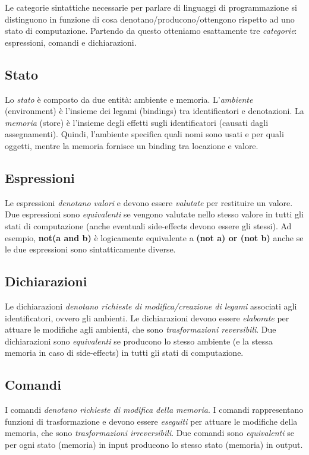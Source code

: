 \documentclass[a4paper,oneside,titlepage]{book}
\begin{document}
Le categorie sintattiche necessarie per parlare di linguaggi di programmazione si distinguono in funzione di cosa denotano/producono/ottengono rispetto ad uno stato di computazione. Partendo da questo otteniamo esattamente tre \textit{categorie}: espressioni, comandi e dichiarazioni.

\subsection{Stato}
Lo \textit{stato} è composto da due entità: ambiente e memoria. L'\textit{ambiente} (environment) è l'insieme dei legami (bindings) tra identificatori e denotazioni. La \textit{memoria} (store) è l'insieme degli effetti sugli identificatori (causati dagli assegnamenti). Quindi, l'ambiente specifica quali nomi sono usati e per quali oggetti, mentre la memoria fornisce un binding tra locazione e valore.

\subsection{Espressioni}
Le espressioni \textit{denotano valori} e devono essere \textit{valutate} per restituire un valore. Due espressioni sono \textit{equivalenti} se vengono valutate nello stesso valore in tutti gli stati di computazione (anche eventuali side-effects devono essere gli stessi). Ad esempio, \textbf{not(a and b)} è logicamente equivalente a \textbf{(not a) or (not b)} anche se le due espressioni sono sintatticamente diverse.

\subsection{Dichiarazioni}
Le dichiarazioni \textit{denotano richieste di modifica/creazione di legami} associati agli identificatori, ovvero gli ambienti. Le dichiarazioni devono essere \textit{elaborate} per attuare le modifiche agli ambienti, che sono \textit{trasformazioni reversibili}. Due dichiarazioni sono \textit{equivalenti} se producono lo stesso ambiente (e la stessa memoria in caso di side-effects) in tutti gli stati di computazione.

\subsection{Comandi}
I comandi \textit{denotano richieste di modifica della memoria}. I comandi rappresentano funzioni di trasformazione e devono essere \textit{eseguiti} per attuare le modifiche della memoria, che sono \textit{trasformazioni irreversibili}. Due comandi sono \textit{equivalenti} se per ogni stato (memoria) in input producono lo stesso stato (memoria) in output.
\end{document}
